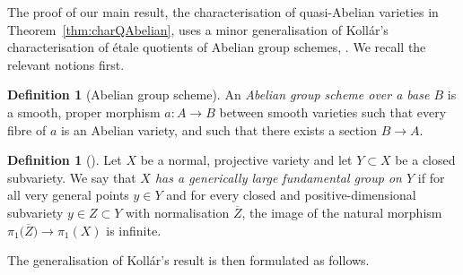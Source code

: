 \documentclass[JEP,XML,SOM,Unicode,published]{cedram}
\theoremstyle{plain}
\theoremstyle{definition}
\newtheorem{defn}[thm]{Definition}
\numberwithin{equation}{thm}
\numberwithin{enumi}{thm}
\begin{document}
The proof of our main result, the characterisation of quasi-Abelian varieties in
Theorem~\ref{thm:charQAbelian}, uses a minor generalisation of Kollár's
characterisation of étale quotients of Abelian group schemes,
\cite[Th.\,6.3]{Kollar93}. We recall the relevant notions first.

\begin{defn}[Abelian group scheme]
An \emph{Abelian group scheme over a base $B$} is a smooth, proper morphism
$a: A \to B$ between smooth varieties such that every fibre of $a$ is an Abelian
variety, and such that there exists a section $B \to A$.
\end{defn}

\begin{defn}[]
Let $X$ be a normal, projective variety and let $Y \subset X$ be a closed
subvariety. We say that \emph{$X$ has a generically large fundamental group
on $Y$} if for all very general points $y \in Y$ and for every closed and
positive-dimensional subvariety $y \in Z \subset Y$ with normalisation $\overline{Z}$,
the image of the natural morphism $\pi_1\bigl(\overline{Z} \bigr) \to \pi_1(X)$ is
infinite.
\end{defn}

The generalisation of Kollár's result is then formulated as follows.
\end{document}
